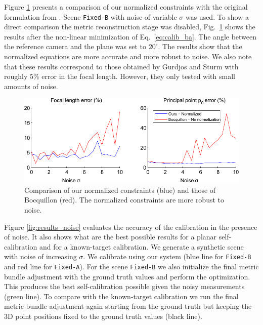 \documentclass[10pt,twocolumn,letterpaper]{article}
\begin{document}
Figure \ref{fig:results_no_norm} presents a comparison of our normalized constraints with the original formulation from \cite{bocquillon2006}. Scene \texttt{Fixed-B} with noise of variable $\sigma$ was used. To show a direct comparison the metric reconstruction stage was disabled, Fig.~\ref{fig:results_no_norm} shows the results after the non-linear minimization of Eq.~\eqref{eq:calib_ba}. The angle between the reference camera and the plane was set to $20^\circ$. The results show that the normalized equations are more accurate and more robust to noise. We also note that these results correspond to those obtained by Gurdjos and Sturm \cite{gurdjos2003} with roughly $5\%$ error in the focal length. However, they only tested with small amounts of noise.

\begin{figure}
\centering
\includegraphics[width=\linewidth]{images/resultsNoNorm.pdf}
\caption{Comparison of our normalized constraints (blue) and those of Bocquillon \cite{bocquillon2006} (red). The normalized constraints are more robust to noise.}
\label{fig:results_no_norm}
\end{figure}

Figure \ref{fig:results_noise} evaluates the accuracy of the calibration in the presence of noise. It also shows what are the best possible results for a planar self-calibration and for a known-target calibration. We generate a synthetic scene with noise of increasing $\sigma$. We calibrate using our system (blue line for \texttt{Fixed-B} and red line for \texttt{Fixed-A}). For the scene \texttt{Fixed-B} we also initialize the final metric bundle adjustment with the ground truth values and perform the optimization. This produces the best self-calibration possible given the noisy measurements (green line). To compare with the known-target calibration we run the final metric bundle adjustment again starting from the ground truth but keeping the 3D point positions fixed to the ground truth values (black line). 
\end{document}

